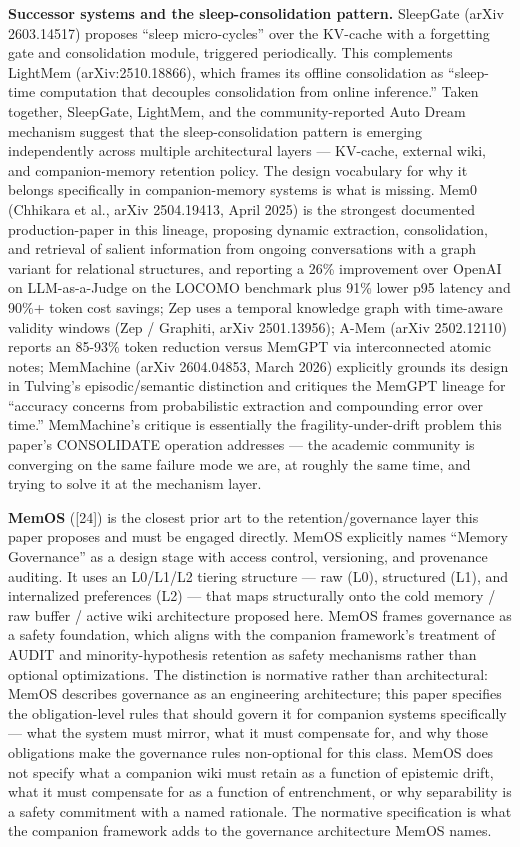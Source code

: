 \documentclass[
  11pt,
]{article}
\begin{document}
\textbf{Successor systems and the sleep-consolidation pattern.}
SleepGate (arXiv 2603.14517) proposes ``sleep micro-cycles'' over the
KV-cache with a forgetting gate and consolidation module, triggered
periodically. This complements LightMem (arXiv:2510.18866), which frames
its offline consolidation as ``sleep-time computation that decouples
consolidation from online inference.'' Taken together, SleepGate,
LightMem, and the community-reported Auto Dream mechanism suggest that
the sleep-consolidation pattern is emerging independently across
multiple architectural layers --- KV-cache, external wiki, and
companion-memory retention policy. The design vocabulary for why it
belongs specifically in companion-memory systems is what is missing.
Mem0 (Chhikara et al., arXiv 2504.19413, April 2025) is the strongest
documented production-paper in this lineage, proposing dynamic
extraction, consolidation, and retrieval of salient information from
ongoing conversations with a graph variant for relational structures,
and reporting a 26\% improvement over OpenAI on LLM-as-a-Judge on the
LOCOMO benchmark plus 91\% lower p95 latency and 90\%+ token cost
savings; Zep uses a temporal knowledge graph with time-aware validity
windows (Zep / Graphiti, arXiv 2501.13956); A-Mem (arXiv 2502.12110)
reports an 85-93\% token reduction versus MemGPT via interconnected
atomic notes; MemMachine (arXiv 2604.04853, March 2026) explicitly
grounds its design in Tulving's episodic/semantic distinction and
critiques the MemGPT lineage for ``accuracy concerns from probabilistic
extraction and compounding error over time.'' MemMachine's critique is
essentially the fragility-under-drift problem this paper's CONSOLIDATE
operation addresses --- the academic community is converging on the same
failure mode we are, at roughly the same time, and trying to solve it at
the mechanism layer.

\textbf{MemOS} ({[}24{]}) is the closest prior art to the
retention/governance layer this paper proposes and must be engaged
directly. MemOS explicitly names ``Memory Governance'' as a design stage
with access control, versioning, and provenance auditing. It uses an
L0/L1/L2 tiering structure --- raw (L0), structured (L1), and
internalized preferences (L2) --- that maps structurally onto the cold
memory / raw buffer / active wiki architecture proposed here. MemOS
frames governance as a safety foundation, which aligns with the
companion framework's treatment of AUDIT and minority-hypothesis
retention as safety mechanisms rather than optional optimizations. The
distinction is normative rather than architectural: MemOS describes
governance as an engineering architecture; this paper specifies the
obligation-level rules that should govern it for companion systems
specifically --- what the system must mirror, what it must compensate
for, and why those obligations make the governance rules non-optional
for this class. MemOS does not specify what a companion wiki must retain
as a function of epistemic drift, what it must compensate for as a
function of entrenchment, or why separability is a safety commitment
with a named rationale. The normative specification is what the
companion framework adds to the governance architecture MemOS names.
\end{document}
